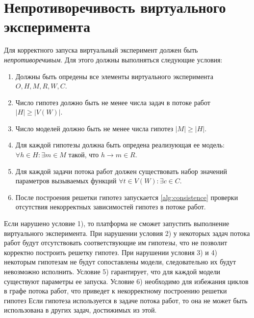 \section{Непротиворечивость виртуального эксперимента}\label{sect2_5}
Для корректного запуска виртуальный эксперимент должен быть \textit{непротиворечивым}. 
Для этого должны выполняться следующие условия:
\begin{enumerate}
    \item Должны быть опредены все элементы виртуального эксперимента $O, H, M, R, W, C$.
    \item Число гипотез должно быть не менее числа задач в потоке работ $|H| \geq |V(W)| $.
    \item Число моделей должно быть не менее числа гипотез $|M| \geq |H|$.
    \item Для каждой гипотезы должна быть опредена реализующая ее модель: $ \forall h \in H: \exists m \in M$ такой, 
            что $h \rightarrow m \in R$.
    
    \item Для каждой задачи потока работ должен существовать набор значений параметров вызываемых функций 
            $ \forall t \in V(W): \exists c \in C$.
    \item После построения решетки гипотез запускается \cref{alg:consistence} проверки отсутствия 
            некорректных зависимостей гипотез в потоке работ.
\end{enumerate}

Если нарушено условие 1), то платформа не сможет запустить выполнение виртуального эксперимента.
При нарушении условия 2) у некоторых задач потока работ будут отсутствовать соответствующие им гипотезы, что не 
позволит корректно построить решетку гипотез. При нарушении условия 3) и 4) некоторым гипотезам не будут 
сопоставлены модели, следовательно их будут невозможно исполнить. Условие 5) гарантирует, что для каждой модели 
существуют параметры ее запуска. Условие 6) необходимо для избежания циклов в графе потока работ, что приведет к 
некорректному построению решетки гипотез Если гипотеза используется в задаче потока работ, то она не может быть 
использована в других задач, достижимых из этой. 

